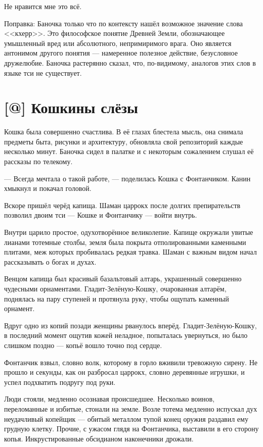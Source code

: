 Не нравится мне это всё.

Поправка: Баночка только что по контексту нашёл возможное значение слова <<кхерр>>.
Это философское понятие Древней Земли, обозначающее умышленный вред или абсолютного, непримиримого врага.
Оно является антонимом другого понятия --- намеренное полезное действие, безусловное дружелюбие.
Баночка растерянно сказал, что, по-видимому, аналогов этих слов в языке тси не существует.

\section{[@] Кошкины слёзы}

\textspace

Кошка была совершенно счастлива.
В её глазах блестела мысль, она снимала предметы быта, рисунки и архитектуру, обновляла свой репозиторий каждые несколько минут.
Баночка сидел в палатке и с некоторым сожалением слушал её рассказы по телекому.

--- Всегда мечтала о такой работе, --- поделилась Кошка с Фонтанчиком.
Канин хмыкнул и покачал головой.

Вскоре пришёл черёд капища.
Шаман царрокх после долгих препирательств позволил двоим тси --- Кошке и Фонтанчику --- войти внутрь.

Внутри царило простое, одухотворённое великолепие.
Капище окружали увитые лианами тотемные столбы, земля была покрыта отполированными каменными плитами, меж которых пробивалась редкая травка.
Шаман с важным видом начал рассказывать о богах и духах.

Венцом капища был красивый базальтовый алтарь, украшенный совершенно чудесными орнаментами.
Гладит-Зелёную-Кошку, очарованная алтарём, поднялась на пару ступеней и протянула руку, чтобы ощупать каменный орнамент.

Вдруг одно из копий позади женщины рванулось вперёд.
Гладит-Зелёную-Кошку, в последний момент ощутив кожей неладное, попыталась увернуться, но было слишком поздно --- копьё вошло точно под сердце.

Фонтанчик взвыл, словно волк, которому в горло вживили тревожную сирену.
Не прошло и секунды, как он разбросал царрокх, словно деревянные игрушки, и успел подхватить подругу под руки.

Люди стояли, медленно осознавая происшедшее.
Несколько воинов, переломанные и избитые, стонали на земле.
Возле тотема медленно испускал дух неудачливый копейщик --- обитый металлом тупой конец оружия раздавил ему грудную клетку.
Прочие, с ужасом глядя на Фонтанчика, выставили в его сторону копья.
Инкрустированные обсидианом наконечники дрожали.

